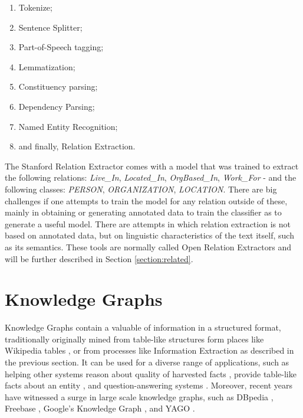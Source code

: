 \documentclass[11pt,a4paper,openright]{memoir}
\begin{document}
\begin{enumerate}
  \item Tokenize;
  \item Sentence Splitter;
  \item Part-of-Speech tagging;
  \item Lemmatization;
  \item Constituency parsing;
  \item Dependency Parsing;
  \item Named Entity Recognition;
  \item and finally, Relation Extraction.
\end{enumerate}

The Stanford Relation Extractor comes with a model that was trained to extract the following relations: \emph{Live\_In}, \emph{Located\_In}, \emph{OrgBased\_In}, \emph{Work\_For} - and the following classes: \emph{PERSON}, \emph{ORGANIZATION}, \emph{LOCATION}. There are big challenges if one attempts to train the model for any relation outside of these, mainly in obtaining or generating annotated data to train the classifier as to generate a useful model. There are attempts in which relation extraction is not based on annotated data, but on linguistic characteristics of the text itself, such as its semantics. These tools are normally called Open Relation Extractors and will be further described in Section \ref{section:related}.


%
%
%
%


\section{Knowledge Graphs}

Knowledge Graphs contain a valuable of information in a structured format, traditionally originally mined from table-like structures form places like Wikipedia \cite{wiki} tables \cite{dbpedia-swj}, or from processes like Information Extraction as described in the previous section. It can be used for a diverse range of applications, such as helping other systems reason about quality of harvested facts \cite{Suchanek2007}, provide table-like facts about an entity \cite{google}, and question-answering systems \cite{hixon-clark-hajishirzi-2015}. Moreover, recent years have witnessed a surge in large scale knowledge graphs, such as DBpedia \cite{dbpedia-swj}, Freebase \cite{Bollacker2008}, Google’s Knowledge Graph \cite{google}, and YAGO \cite{Suchanek2007}.
\end{document}
